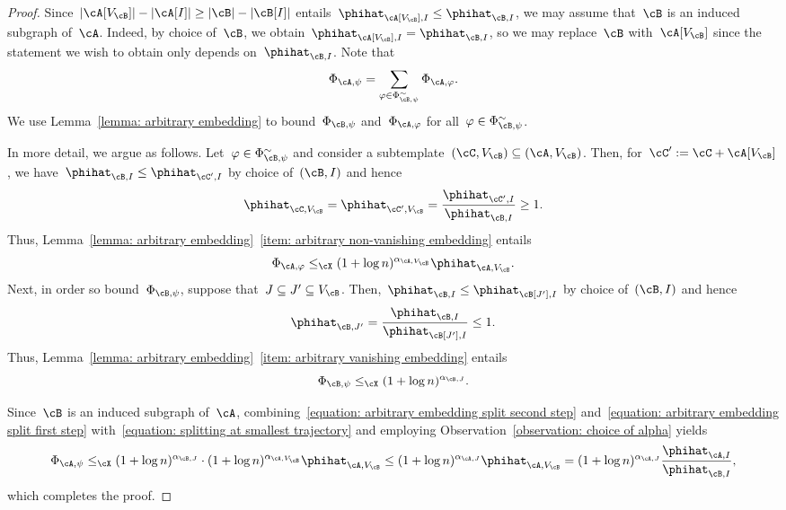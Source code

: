 \documentclass[11pt]{amsart}
\DeclarePairedDelimiter{\abs}{\lvert}{\rvert}
\newcommand{\Xleq}{\leq_{\cX}}
\def\phi{\varphi}
\theoremstyle{definition}
\numberwithin{equation}{section}
\begin{document}
	
	\begin{proof}
		Since~$\abs{\cA[V_\cB]}-\abs{\cA[I]}\geq \abs{\cB}-\abs{\cB[I]}$ entails~$\phihat_{\cA[V_\cB],I}\leq \phihat_{\cB,I}$, we may assume that~$\cB$ is an induced subgraph of~$\cA$.
		Indeed, by choice of~$\cB$, we obtain~$\phihat_{\cA[V_\cB],I}= \phihat_{\cB,I}$, so we may replace~$\cB$ with~$\cA[V_\cB]$ since the statement we wish to obtain only depends on~$\phihat_{\cB,I}$.
		Note that
		\begin{equation}\label{equation: splitting at smallest trajectory}
			\Phi_{\cA,\psi}=\sum_{\phi\in \Phi^\sim_{\cB,\psi}}\Phi_{\cA,\phi}.
		\end{equation}
		We use Lemma~\ref{lemma: arbitrary embedding} to bound~$\Phi_{\cB,\psi}$ and~$\Phi_{\cA,\phi}$ for all~$\phi\in \Phi^\sim_{\cB,\psi}$.
		
		In more detail, we argue as follows.
		Let~$\phi\in \Phi^\sim_{\cB,\psi}$ and consider a subtemplate~$(\cC,V_\cB)\subseteq (\cA,V_\cB)$.
		Then, for~$\cC':=\cC+\cA[V_\cB]$, we have~$\phihat_{\cB,I}\leq \phihat_{\cC',I}$ by choice of~$(\cB,I)$ and hence
		\begin{equation*}
			\phihat_{\cC,V_\cB}
			=\phihat_{\cC',V_\cB}
			=\frac{\phihat_{\cC',I}}{\phihat_{\cB,I}}
			\geq 1.
		\end{equation*}
		Thus, Lemma~\ref{lemma: arbitrary embedding}~\ref{item: arbitrary non-vanishing embedding} entails
		\begin{equation}\label{equation: arbitrary embedding split second step}
			\Phi_{\cA,\phi}\Xleq (1+\log n)^{\alpha_{\cA,V_\cB}}\phihat_{\cA,V_\cB}.
		\end{equation}
		Next, in order so bound~$\Phi_{\cB,\psi}$, suppose that~$J\subseteq J'\subseteq V_\cB$.
		Then,~$\phihat_{\cB,I}\leq \phihat_{\cB[J'],I}$ by choice of~$(\cB,I)$ and hence
		\begin{equation*}
			\phihat_{\cB,J'}
			=\frac{\phihat_{\cB,I}}{\phihat_{\cB[J'],I}}
			\leq 1.
		\end{equation*}
		Thus, Lemma~\ref{lemma: arbitrary embedding}~\ref{item: arbitrary vanishing embedding} entails
		\begin{equation}\label{equation: arbitrary embedding split first step}
			\Phi_{\cB,\psi}\Xleq (1+\log n)^{\alpha_{\cB,J}}.
		\end{equation}
		
		Since~$\cB$ is an induced subgraph of~$\cA$, combining~\eqref{equation: arbitrary embedding split second step} and~\eqref{equation: arbitrary embedding split first step} with~\eqref{equation: splitting at smallest trajectory} and employing Observation~\ref{observation: choice of alpha} yields
		\begin{equation*}
			\Phi_{\cA,\psi}
			\Xleq (1+\log n)^{\alpha_{\cB,J}}\cdot (1+\log n)^{\alpha_{\cA,V_\cB}}\phihat_{\cA,V_\cB}
			\leq (1+\log n)^{\alpha_{\cA,J}}\phihat_{\cA,V_\cB}
			=(1+\log n)^{\alpha_{\cA,J}}\frac{\phihat_{\cA,I}}{\phihat_{\cB,I}},
		\end{equation*}
		which completes the proof.
	\end{proof}
	
\end{document}
